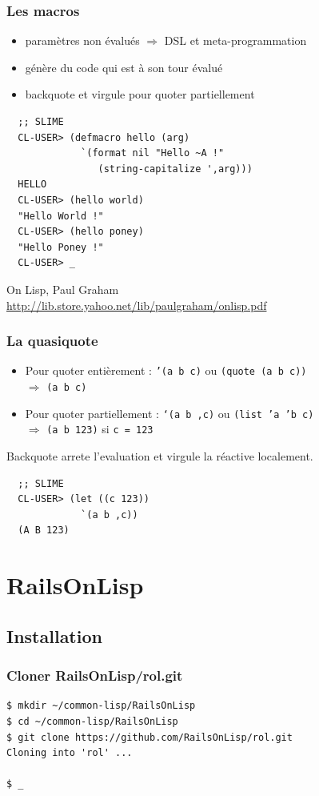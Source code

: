\documentclass[8pt]{beamer}
\begin{document}
\begin{frame}[fragile]
  \frametitle{Les macros}
  \begin{itemize}
    \item paramètres non évalués $\Rightarrow$ DSL et meta-programmation
    \item génère du code qui est à son tour évalué
    \item backquote et virgule pour quoter partiellement
  \end{itemize}
\begin{verbatim}
  ;; SLIME
  CL-USER> (defmacro hello (arg)
             `(format nil "Hello ~A !"
                (string-capitalize ',arg)))
  HELLO
  CL-USER> (hello world)
  "Hello World !"
  CL-USER> (hello poney)
  "Hello Poney !"
  CL-USER> _
\end{verbatim}
  \vspace{1em}
  On Lisp, Paul Graham \\
  \url{http://lib.store.yahoo.net/lib/paulgraham/onlisp.pdf}
\end{frame}

\begin{frame}[fragile]
  \frametitle{La quasiquote}
  \begin{itemize}
  \item Pour quoter entièrement : {\tt '(a b c)} ou {\tt (quote (a b c))} \\
    $\Rightarrow$ {\tt (a b c)}
  \item Pour quoter partiellement : {\tt `(a b ,c)} ou {\tt (list 'a 'b c)} \\
    $\Rightarrow$ {\tt (a b 123)} si {\tt c = 123}
  \end{itemize}
  Backquote arrete l'evaluation et virgule la réactive localement.
\begin{verbatim}
  ;; SLIME
  CL-USER> (let ((c 123))
             `(a b ,c))
  (A B 123)
\end{verbatim}
\end{frame}

\section{RailsOnLisp}
\subsection{Installation}

\begin{frame}[fragile]
  \frametitle{Cloner RailsOnLisp/rol.git}
\begin{verbatim}
$ mkdir ~/common-lisp/RailsOnLisp
$ cd ~/common-lisp/RailsOnLisp
$ git clone https://github.com/RailsOnLisp/rol.git
Cloning into 'rol' ...

$ _
\end{verbatim}
\end{frame}
\end{document}
